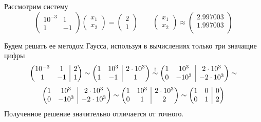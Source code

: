 \documentclass[professionalfonts,compress,unicode]{beamer}
\begin{document}
{
	Рассмотрим систему
	$$
	\begin{pmatrix}
		10^{-3}&1\\
		1&-1
	\end{pmatrix}
	\begin{pmatrix}
		x_1\\x_2
	\end{pmatrix} = 
	\begin{pmatrix}
		2\\1
	\end{pmatrix}
	\qquad
	\begin{pmatrix}
		x_1\\x_2
	\end{pmatrix} \approx
	\begin{pmatrix}
		2.997003\\
		1.997003\\
	\end{pmatrix}	
	$$
	
	Будем решать ее методом Гаусса, используя в вычислениях только три значащие цифры
	$$
	\left(
	\begin{array}{@{}cc|c@{}}
		10^{-3}&1&2\\
		1&-1&1
	\end{array}
	\right)
	\sim
	\left(
	\begin{array}{@{}cc|c@{}}
		1&10^3&2\cdot10^3\\
		1&-1&1
	\end{array}
	\right)
	\stackrel{!}{\sim}
	\left(
	\begin{array}{@{}cc|c@{}}
		1&10^3&2\cdot10^3\\
		0&-10^3&-2\cdot10^3\\
	\end{array}
	\right)
	\sim	
	$$
	$$
	\left(
	\begin{array}{@{}cc|c@{}}
		1&10^3&2\cdot10^3\\
		0&-10^3&-2\cdot10^3\\
	\end{array}
	\right)
	\sim
	\left(
	\begin{array}{@{}cc|c@{}}
		1&10^3&2\cdot10^3\\
		0&1&2\\
	\end{array}
	\right)
	\sim
	\left(
	\begin{array}{@{}cc|c@{}}
		1&0&0\\
		0&1&2\\
	\end{array}
	\right)		
	$$
	Полученное решение значительно отличается от точного.
}
\end{document}
